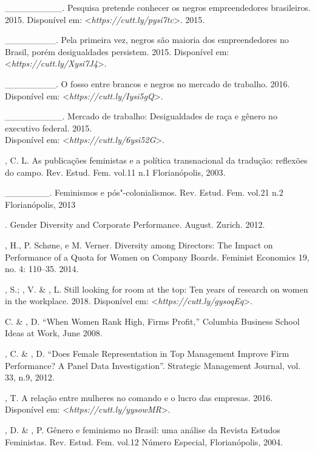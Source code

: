 \begin{Parskip}
\_\_\_\_\_\_\_\_\_. Pesquisa pretende conhecer os negros empreendedores
brasileiros. 2015.
Disponível em: \textless{}\emph{https://cutt.ly/pysi7tc}\textgreater{}.
2015.

\_\_\_\_\_\_\_\_. Pela primeira vez, negros são maioria dos
empreendedores no Brasil, porém desigualdades persistem. 2015.
Disponível em: \textless{}\emph{https://cutt.ly/Xysi7J4}\textgreater{}.

\_\_\_\_\_\_\_\_. O fosso entre brancos e negros no mercado de trabalho.
2016.
Disponível em: \textless{}\emph{https://cutt.ly/Iysi5gQ}\textgreater{}.

\_\_\_\_\_\_\_\_\_. Mercado de trabalho: Desigualdades de raça e gênero
no executivo federal. 2015.\\
Disponível em: \textless{}\emph{https://cutt.ly/6ysi52G}\textgreater{}.

, C. L. As publicações feministas e a política transnacional da
tradução: reflexões do campo. Rev. Estud. Fem. vol.11 n.1 Florianópolis,
2003.

\_\_\_\_\_\_\_. Feminismos e pós"-colonialismos. Rev. Estud. Fem. vol.21
n.2 Florianópolis, 2013

. Gender Diversity and Corporate
Performance. August. Zurich. 2012.

, H., P. Schøne, e M. Verner. Diversity among Directors: The
Impact on Performance of a Quota for Women on Company Boards. Feminist
Economics 19, no. 4: 110--35. 2014.

, S.; , V. \& , L. Still looking for room at the top:
Ten years of research on women in the workplace. 2018.
Disponível em: \textless{}\emph{https://cutt.ly/gysoqEq}\textgreater{}.

 C. \& , D. ``When Women Rank High, Firms Profit,'' Columbia
Business School Ideas at Work, June 2008.

, C. \& , D. ``Does Female Representation in Top Management
Improve Firm Performance? A Panel Data Investigation''. Strategic
Management Journal, vol. 33, n.9, 2012.

, T. A relação entre mulheres no comando e o lucro das empresas.
2016.
Disponível em: \textless{}\emph{https://cutt.ly/yysowMR}\textgreater{}.

, D. \& , P. Gênero e feminismo no Brasil: uma análise da
Revista Estudos Feministas. Rev. Estud. Fem. vol.12 Número Especial,
Florianópolis, 2004.


\end{Parskip}
